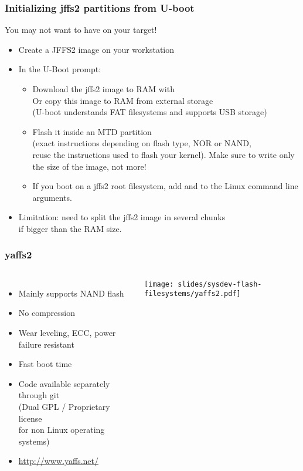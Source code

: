 \begin{frame}
  \frametitle{Initializing jffs2 partitions from U-boot}
  You may not want to have  on your target!
  \begin{itemize}
  \item Create a JFFS2 image on your workstation
  \item In the U-Boot prompt:
    \begin{itemize}
    \item Download the jffs2 image to RAM with \\
      Or copy this image to RAM from external storage\\
      (U-boot understands FAT filesystems and supports USB storage)
    \item Flash it inside an MTD partition\\
      (exact instructions depending on flash type, NOR or NAND,\\
      reuse the instructions used to flash your kernel). Make sure to
      write only the size of the image, not more!
    \item If you boot on a jffs2 root filesystem, add
       and  to the
      Linux command line arguments.
    \end{itemize}
  \item Limitation: need to split the jffs2 image in several chunks\\
    if bigger than the RAM size.
  \end{itemize}
\end{frame}

\begin{frame}
  \frametitle{yaffs2}
  \begin{columns}
    \begin{itemize}
    \item Mainly supports NAND flash
    \item No compression
    \item Wear leveling, ECC, power failure resistant
    \item Fast boot time
    \item Code available separately through git\\
      (Dual GPL / Proprietary license\\
      for non Linux operating systems)
    \item \url{http://www.yaffs.net/}
    \end{itemize}
    \texttt{[image: slides/sysdev-flash-filesystems/yaffs2.pdf]}
  \end{columns}
\end{frame}

